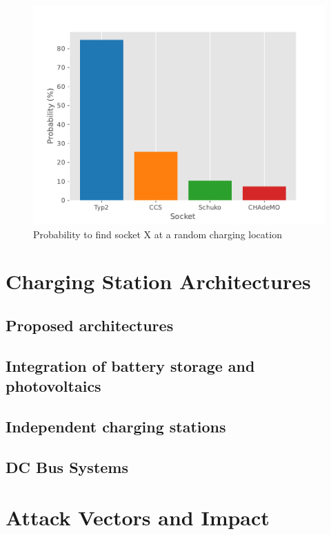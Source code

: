 \documentclass[conference,flushend]{iaria} %
\begin{document}
\begin{figure}[ht]
    \centering
    \includegraphics[width=.489\textwidth]{graphs/socket_probability.pdf}
    \caption{Probability to find socket X at a random charging location}
    \label{fig:socketsprob}
\end{figure}



\section{Charging Station Architectures}

\subsection{Proposed architectures}
\subsection{Integration of battery storage and photovoltaics}
\subsection{Independent charging stations}
\subsection{DC Bus Systems}

\section{Attack Vectors and Impact}
\end{document}
